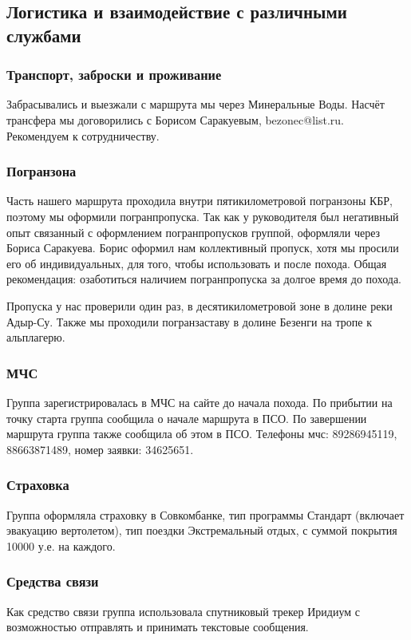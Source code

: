 	\subsection{Логистика и взаимодействие с различными службами}
		\subsubsection{Транспорт, заброски и проживание}
		Забрасывались и выезжали с маршрута мы через Минеральные Воды. Насчёт трансфера мы договорились с Борисом Саракуевым, bezonec@list.ru. Рекомендуем к сотрудничеству.

		\subsubsection{Погранзона}

		Часть нашего маршрута проходила внутри пятикилометровой погранзоны КБР, поэтому мы оформили погранпропуска. Так как у руководителя был негативный опыт связанный с оформлением погранпропусков группой, оформляли через Бориса Саракуева. Борис оформил нам коллективный пропуск, хотя мы просили его об индивидуальных, для того, чтобы использовать и после похода. Общая рекомендация: озаботиться наличием погранпропуска за долгое время до похода.

		Пропуска у нас проверили один раз, в десятикилометровой зоне в долине реки Адыр-Су. Также мы проходили погранзаставу в долине Безенги на тропе к альплагерю.


		\subsubsection{МЧС}
		Группа зарегистрировалась в МЧС на сайте до начала похода. По прибытии на точку старта группа сообщила о начале маршрута в ПСО. По завершении маршрута группа также сообщила об этом в ПСО. Телефоны мчс: 89286945119, 88663871489, номер заявки: 34625651.

		\subsubsection{Страховка}
			Группа оформляла страховку в Совкомбанке, тип программы Стандарт (включает эвакуацию вертолетом), тип поездки Экстремальный отдых, с суммой покрытия 10000 у.е. на каждого.
 
		\subsubsection{Средства связи}
			Как средство связи группа использовала спутниковый трекер Иридиум с возможностью отправлять и принимать текстовые сообщения.

